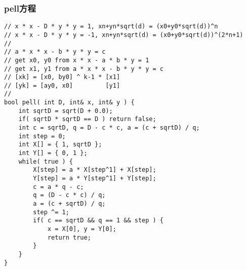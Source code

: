 \subsubsection{pell方程}
\begin{verbatim}
// x * x - D * y * y = 1, xn+yn*sqrt(d) = (x0+y0*sqrt(d))^n
// x * x - D * y * y = -1, xn+yn*sqrt(d) = (x0+y0*sqrt(d))^(2*n+1)
//
// a * x * x - b * y * y = c 
// get x0, y0 from x * x - a * b * y = 1
// get x1, y1 from a * x * x - b * y * y = c
// [xk] = [x0, by0] ^ k-1 * [x1]
// [yk] = [ay0, x0]			[y1]
//
bool pell( int D, int& x, int& y ) {  
	int sqrtD = sqrt(D + 0.0);  
	if( sqrtD * sqrtD == D ) return false;  
	int c = sqrtD, q = D - c * c, a = (c + sqrtD) / q;  
	int step = 0;  
	int X[] = { 1, sqrtD };  
	int Y[] = { 0, 1 };  
	while( true ) {  
		X[step] = a * X[step^1] + X[step];  
		Y[step] = a * Y[step^1] + Y[step];  
		c = a * q - c;  
		q = (D - c * c) / q;  
		a = (c + sqrtD) / q;  
		step ^= 1;  
		if( c == sqrtD && q == 1 && step ) {  
			x = X[0], y = Y[0];  
			return true;  
		}  
	}  
}
\end{verbatim}
